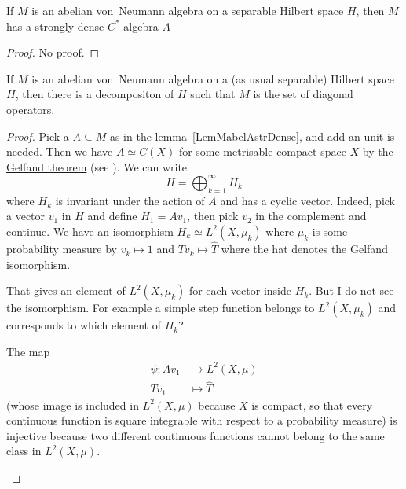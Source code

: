 \begin{lemma}		\label{LemMabelAstrDense}
If $M$ is an abelian von~Neumann algebra on a separable Hilbert space $H$, then $M$ has a strongly dense $C^*$-algebra $A$
\end{lemma}

\begin{proof}
No proof.
\end{proof}

\begin{theorem}		\label{ThoVNableHDiag}
If $M$ is an abelian von~Neumann algebra on a (as usual separable) Hilbert space $H$, then there is a decompositon of $H$ such that $M$ is the set of diagonal operators.
\end{theorem}

\begin{proof}
	Pick a $A\subseteq M$ as in the lemma~\ref{LemMabelAstrDense}, and add an unit is needed. Then we have $A\simeq C(X)$ for some metrisable compact space $X$ by the
	\href{http://en.wikipedia.org/wiki/Gelfand_isomorphism}{Gelfand theorem} (see \cite{Landsman}). We can write
	\begin{equation}
		H=\bigoplus_{k=1}^{\infty}H_k
	\end{equation}
	where $H_k$ is invariant under the action of $A$ and has a cyclic vector. Indeed, pick a vector $v_1$ in $H$ and define $H_1=Av_1$, then pick $v_2$ in the complement and continue. We have an isomorphism $H_k\simeq L^2(X,\mu_k)$ where $\mu_k$ is some probability measure by $v_k\mapsto 1$ and $Tv_k\mapsto\hat T$ where the hat denotes the Gelfand isomorphism.

	\begin{probleme}
		That gives an element of $L^2(X,\mu_k)$ for each vector inside $H_k$. But I do not see the isomorphism. For example a simple step function belongs to $L^2(X,\mu_k)$ and corresponds to which element of $H_k$?

		The map
		\begin{equation}
			\begin{aligned}
			 \psi\colon Av_1&\to L^2(X,\mu) \\
			   Tv_1&\mapsto \hat T
			\end{aligned}
			\end{equation}
		(whose image is included in $L^2(X,\mu)$ because $X$ is compact, so that every continuous function is square integrable with respect to a probability measure) is injective because two different continuous functions cannot belong to the same class in $L^2(X,\mu)$.


\end{probleme}
\end{proof}
